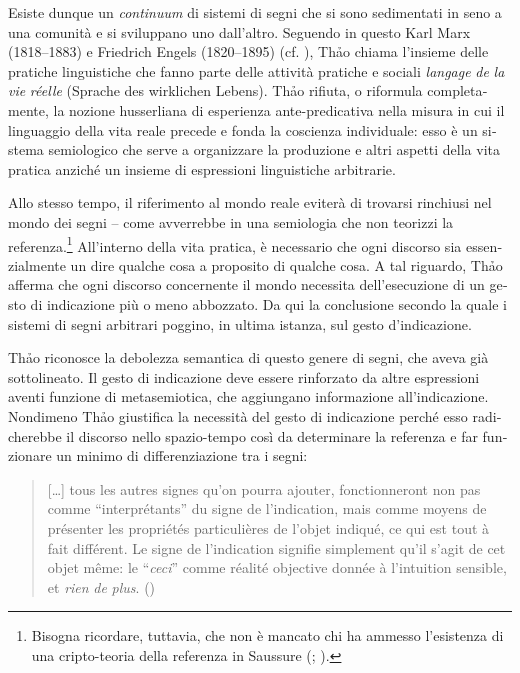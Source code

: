 \documentclass[italian,output=paper,colorlinks,citecolor=brown]{../langscibook}
\begin{document}
\begin{otherlanguage}{italian}
Esiste dunque un \textit{continuum} di sistemi di segni che si sono sedimentati in seno a una comunità e si sviluppano uno dall’altro. Seguendo in questo Karl Marx (1818--1883) e Friedrich Engels (1820--1895) (cf. \citealt[26, 30--31, 331]{MarxEngels1958}), Th\textlatin{ả}o chiama l’insieme delle pratiche linguistiche che fanno parte delle attività pratiche e sociali \textit{langage} \textit{de} \textit{la} \textit{vie} \textit{réelle} (Sprache des wirklichen Lebens). Th\textlatin{ả}o rifiuta, o riformula completamente, la nozione husserliana di esperienza ante-predicativa nella misura in cui il linguaggio della vita reale precede e fonda la coscienza individuale: esso è un sistema semiologico che serve a organizzare la produzione e altri aspetti della vita pratica anziché un insieme di espressioni linguistiche arbitrarie.

Allo stesso tempo, il riferimento al mondo reale eviterà di trovarsi rinchiusi nel mondo dei segni – come avverrebbe in una semiologia che non teorizzi la referenza.\footnote{ \textrm{Bisogna ricordare, tuttavia, che non è mancato chi ha ammesso l’esistenza di una cripto-teoria della referenza in Saussure (\citealt{Arrivé2007}; \citealt{Bouquet1992}).}} All’interno della vita pratica, è necessario che ogni discorso sia essenzialmente un dire qualche cosa a proposito di qualche cosa. A tal riguardo, Th\textlatin{ả}o afferma che ogni discorso concernente il mondo necessita dell’esecuzione di un gesto di indicazione più o meno abbozzato. Da qui la conclusione secondo la quale i sistemi di segni arbitrari poggino, in ultima istanza, sul gesto d’indicazione.

Th\textlatin{ả}o riconosce la debolezza semantica di questo genere di segni, che \citet[48]{Eco1984} aveva già sottolineato. Il gesto di indicazione deve essere rinforzato da altre espressioni aventi funzione di metasemiotica, che aggiungano informazione all’indicazione. Nondimeno Th\textlatin{ả}o giustifica la necessità del gesto di indicazione perché esso radicherebbe il discorso nello spazio-tempo così da determinare la referenza e far funzionare un minimo di differenziazione tra i segni:

\begin{quote}
[…] tous les autres signes qu’on pourra ajouter, fonctionneront non pas comme “interprétants” du signe de l’indication, mais comme moyens de présenter les propriétés particulières de l’objet indiqué, ce qui est tout à fait différent. Le signe de l’indication signifie simplement qu’il s’agit de cet objet même: le “\textit{ceci}” comme réalité objective donnée à l’intuition sensible, et \textit{rien} \textit{de} \textit{plus}. (\citealt[62]{Thao1973})
\end{quote}


\end{otherlanguage}
\end{document}
